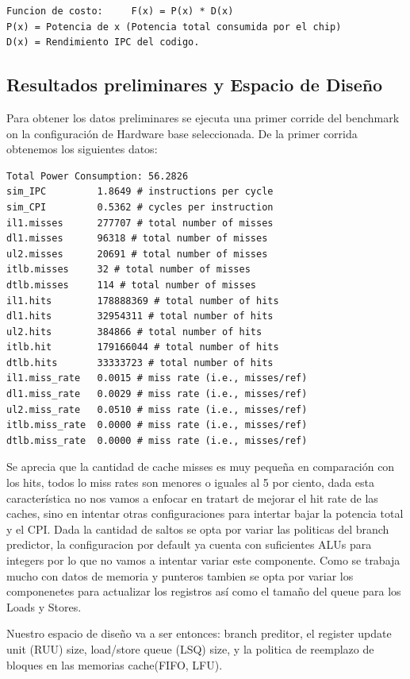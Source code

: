 \documentclass[journal]{IEEEtran}
\begin{document}
\footnotesize \begin{verbatim}
Funcion de costo:     F(x) = P(x) * D(x)
P(x) = Potencia de x (Potencia total consumida por el chip)
D(x) = Rendimiento IPC del codigo.
\end{verbatim}
\normalsize

\subsection{Resultados preliminares y Espacio de Dise\~no}
Para obtener los datos preliminares se ejecuta una primer corride del benchmark on la configuraci\'on de Hardware base seleccionada.
De la primer corrida obtenemos los siguientes datos: \newline
\footnotesize \begin{verbatim}
Total Power Consumption: 56.2826
sim_IPC         1.8649 # instructions per cycle
sim_CPI         0.5362 # cycles per instruction
il1.misses      277707 # total number of misses
dl1.misses      96318 # total number of misses
ul2.misses      20691 # total number of misses
itlb.misses     32 # total number of misses
dtlb.misses     114 # total number of misses
il1.hits        178888369 # total number of hits
dl1.hits        32954311 # total number of hits
ul2.hits        384866 # total number of hits
itlb.hit        179166044 # total number of hits
dtlb.hits       33333723 # total number of hits
il1.miss_rate   0.0015 # miss rate (i.e., misses/ref)
dl1.miss_rate   0.0029 # miss rate (i.e., misses/ref)
ul2.miss_rate   0.0510 # miss rate (i.e., misses/ref)
itlb.miss_rate  0.0000 # miss rate (i.e., misses/ref)
dtlb.miss_rate  0.0000 # miss rate (i.e., misses/ref)
\end{verbatim}
\normalsize

Se aprecia que la cantidad de cache misses es muy peque\~na en comparaci\'on con los hits, todos lo miss rates son menores o iguales al 5 por ciento, dada esta caracter\'istica no nos vamos a enfocar en tratart de mejorar el hit rate de las caches, sino en intentar otras configuraciones para intertar bajar la potencia total y el CPI.
Dada la cantidad de saltos se opta por variar las politicas del branch predictor, la configuracion por default ya cuenta con suficientes ALUs para integers por lo que no vamos a intentar variar este componente.  Como se trabaja mucho con datos de memoria y punteros tambien se opta por variar los componenetes para actualizar los registros as\'i como el tama\~no del queue para los Loads y Stores.

Nuestro espacio de dise\~no va a ser entonces: branch preditor, el register update unit (RUU) size, load/store queue (LSQ) size, y la politica de reemplazo de bloques en las memorias cache(FIFO, LFU).
\end{document}
